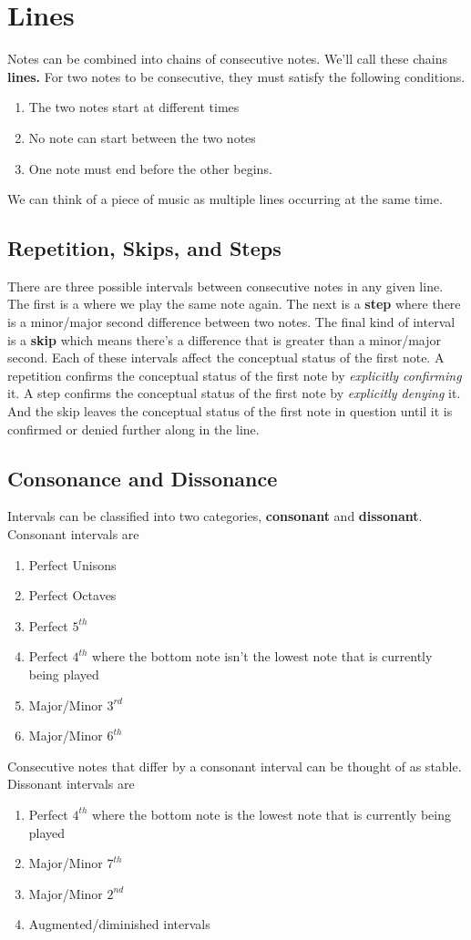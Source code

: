 \documentclass{article}
\begin{document}
\section{Lines}
Notes can be combined into chains of consecutive notes. We'll call these chains \textbf{lines.} For two notes to be consecutive, they must satisfy the following conditions.
\begin{enumerate}
  \item The two notes start at different times
  \item No note can start between the two notes
  \item One note must end before the other begins.
\end{enumerate}
We can think of a piece of music as multiple lines occurring at the same time.
\subsection{Repetition, Skips, and Steps}
There are three possible intervals between consecutive notes in any given line. The first is a  where we play the same note again. The next is a \textbf{step} where there is a minor/major second difference between two notes. The final kind of interval is a \textbf{skip} which means there's a difference that is greater than a minor/major second. Each of these intervals affect the conceptual status of the first note. A repetition confirms the conceptual status of the first note by \textit{explicitly confirming} it. A step confirms the conceptual status of the first note by \textit{explicitly denying} it. And the skip leaves the conceptual status of the first note in question until it is confirmed or denied further along in the line.
\subsection{Consonance and Dissonance}
Intervals can be classified into two categories, \textbf{consonant} and \textbf{dissonant}. Consonant intervals are
\begin{enumerate}
  \item Perfect Unisons
  \item Perfect Octaves
  \item Perfect $5^{th}$
  \item Perfect $4^{th}$ where the bottom note isn't the lowest note that is currently being played
  \item Major/Minor $3^{rd}$
  \item Major/Minor $6^{th}$
\end{enumerate}
Consecutive notes that differ by a consonant interval can be thought of as stable. Dissonant intervals are
\begin{enumerate}
  \item Perfect $4^{th}$ where the bottom note is the lowest note that is currently being played
  \item Major/Minor $7^{th}$
  \item Major/Minor $2^{nd}$
  \item Augmented/diminished intervals
\end{enumerate}
\end{document}
